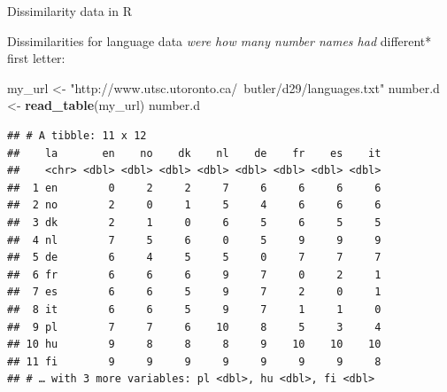 \documentclass[ignorenonframetext,]{beamer}
\newenvironment{Shaded}{\begin{snugshade}}{\end{snugshade}}
\newcommand{\KeywordTok}[1]{\textcolor[rgb]{0.13,0.29,0.53}{\textbf{#1}}}
\newcommand{\NormalTok}[1]{#1}
\newcommand{\StringTok}[1]{\textcolor[rgb]{0.31,0.60,0.02}{#1}}
\begin{document}
\begin{frame}[fragile]{Dissimilarity data in R}
\protect\hypertarget{dissimilarity-data-in-r}{}

Dissimilarities for language data \emph{ were how many number names had
}different* first letter:

\begin{Shaded}
\begin{Highlighting}[]
\NormalTok{my_url <-}\StringTok{ "http://www.utsc.utoronto.ca/~butler/d29/languages.txt"}
\NormalTok{number.d <-}\StringTok{ }\KeywordTok{read_table}\NormalTok{(my_url)}
\NormalTok{number.d}
\end{Highlighting}
\end{Shaded}

\begin{verbatim}
## # A tibble: 11 x 12
##    la       en    no    dk    nl    de    fr    es    it
##    <chr> <dbl> <dbl> <dbl> <dbl> <dbl> <dbl> <dbl> <dbl>
##  1 en        0     2     2     7     6     6     6     6
##  2 no        2     0     1     5     4     6     6     6
##  3 dk        2     1     0     6     5     6     5     5
##  4 nl        7     5     6     0     5     9     9     9
##  5 de        6     4     5     5     0     7     7     7
##  6 fr        6     6     6     9     7     0     2     1
##  7 es        6     6     5     9     7     2     0     1
##  8 it        6     6     5     9     7     1     1     0
##  9 pl        7     7     6    10     8     5     3     4
## 10 hu        9     8     8     8     9    10    10    10
## 11 fi        9     9     9     9     9     9     9     8
## # … with 3 more variables: pl <dbl>, hu <dbl>, fi <dbl>
\end{verbatim}

\end{frame}
\end{document}
